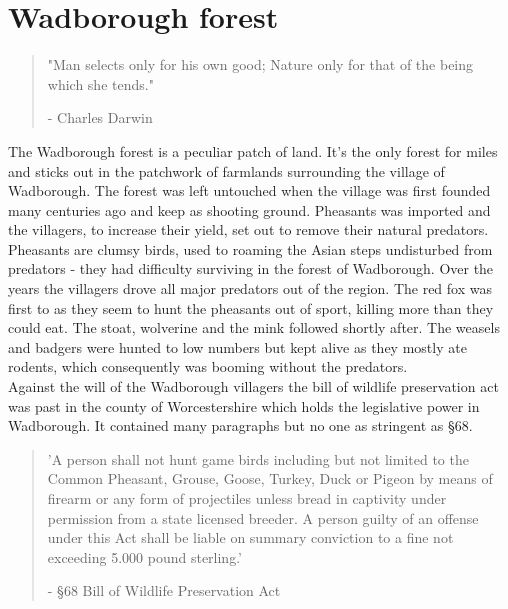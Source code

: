 \documentclass[smalldemyvopaper,11pt,twoside,onecolumn,openright,extrafontsizes]{memoir}
\begin{document}


\mainmatter
\chapter{Wadborough forest}
\vspace{-1.3cm}
\begin{localsize}{10}
	\begin{quote}
		"Man selects only for his own good; Nature only for that of the being which she tends."
		\begin{flushright}- Charles Darwin\end{flushright}
	\end{quote} 
\end{localsize}
\vspace{1cm}

The Wadborough forest is a peculiar patch of land. It's the only forest for miles and sticks out in the patchwork of farmlands surrounding the village of Wadborough. The forest was left untouched when the village was first founded many centuries ago and keep as shooting ground. Pheasants was imported and the villagers, to increase their yield, set out to remove their natural predators. \\

Pheasants are clumsy birds, used to roaming the Asian steps undisturbed from predators - they had difficulty surviving in the forest of Wadborough. Over the years the villagers drove all major predators out of the region. The red fox was first to as they seem to hunt the pheasants out of sport, killing more than they could eat. The stoat, wolverine and the mink followed shortly after. The weasels and badgers were hunted to low numbers but kept alive as they mostly ate rodents, which consequently was booming without the predators. \\

Against the will of the Wadborough villagers the bill of wildlife preservation act was past in the county of Worcestershire which holds the legislative power in Wadborough. It contained many paragraphs but no one as stringent as §68.

\begin{localsize}{10}
\begin{quote}
'A person shall not hunt game birds including but not limited to the Common Pheasant, Grouse, Goose, Turkey, Duck or Pigeon by means of firearm or any form of projectiles unless bread in captivity under permission from a state licensed breeder. A person guilty of an offense under this Act shall be liable on summary conviction to a fine not exceeding 5.000 pound sterling.'
\begin{flushright}- §68 Bill of Wildlife Preservation Act\end{flushright}
\end{quote} 
\end{localsize}
\end{document}
